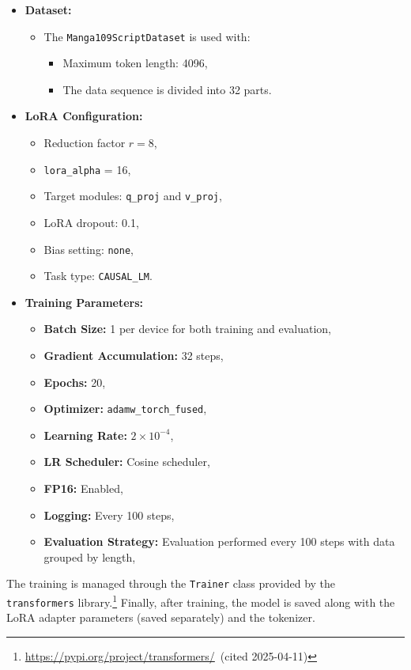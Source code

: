 \documentclass[sigconf, screen, review, nonacm, anonymous]{acmart}
\begin{document}
\begin{itemize}
    \item \textbf{Dataset:}
    \begin{itemize}
        \item The \texttt{Manga109ScriptDataset} is used with:
        \begin{itemize}
            \item Maximum token length: 4096,
            \item The data sequence is divided into 32 parts.
        \end{itemize}
    \end{itemize}
    \item \textbf{LoRA Configuration:}
    \begin{itemize}
        \item Reduction factor $r = 8$,
        \item \texttt{lora\_alpha} = 16,
        \item Target modules: \texttt{q\_proj} and \texttt{v\_proj},
        \item LoRA dropout: 0.1,
        \item Bias setting: \texttt{none},
        \item Task type: \texttt{CAUSAL\_LM}.
    \end{itemize}
    \item \textbf{Training Parameters:}
    \begin{itemize}
        \item \textbf{Batch Size:} 1 per device for both training and evaluation,
        \item \textbf{Gradient Accumulation:} 32 steps,
        \item \textbf{Epochs:} 20,
        \item \textbf{Optimizer:} \texttt{adamw\_torch\_fused},
        \item \textbf{Learning Rate:} $2 \times 10^{-4}$,
        \item \textbf{LR Scheduler:} Cosine scheduler,
        \item \textbf{FP16:} Enabled,
        \item \textbf{Logging:} Every 100 steps,
        \item \textbf{Evaluation Strategy:} Evaluation performed every 100 steps with data grouped by length,
    \end{itemize}
\end{itemize}

The training is managed through the \texttt{Trainer} class provided by the \texttt{transformers} library.\footnote{\url{https://pypi.org/project/transformers/}~(cited 2025-04-11)} Finally, after training, the model is saved along with the LoRA adapter parameters (saved separately) and the tokenizer.
\end{document}
